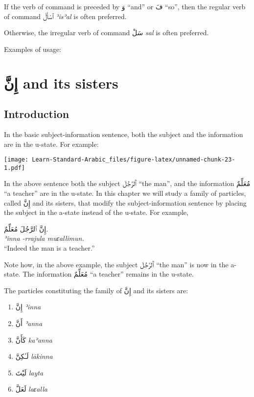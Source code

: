 \documentclass[
  10pt,
]{book}
\providecommand{\tightlist}{%
  \setlength{\itemsep}{0pt}\setlength{\parskip}{0pt}}
\begin{document}
If the verb of command is preceded by
\foreignlanguage{arabic}{وَ} \enquote{and}
or
\foreignlanguage{arabic}{فَ} \enquote{so}, then the regular verb of command
\foreignlanguage{arabic}{ٱسْأَلْ} \emph{ʾisʾal} is often preferred.

Otherwise, the irregular verb of command
\foreignlanguage{arabic}{سَلْ} \emph{sal} is often preferred.

Examples of usage:

\chapter{\texorpdfstring{\foreignlanguage{arabic}{إِنَّ} and its sisters}{إِنَّ and its sisters}}\label{ux625ux646-and-its-sisters}

\section{Introduction}\label{introduction-19}

In the basic subject-information sentence, both the subject and the information are in the u-state. For example:

\texttt{[image: Learn-Standard-Arabic\_files/figure-latex/unnamed-chunk-23-1.pdf]}

In the above sentence both the subject \foreignlanguage{arabic}{ٱَلرَّجُلَ} \enquote{the man}, and the information \foreignlanguage{arabic}{مُعَلِّمٌ} \enquote{a teacher} are in the u-state. In this chapter we will study a family of particles, called
\foreignlanguage{arabic}{إِنَّ} and its sisters,
that modify the subject-information sentence by placing the subject in the a-state instead of the u-state. For example,

\foreignlanguage{arabic}{إِنَّ ٱلرَّجُلَ مُعَلِّمٌ.}\\
\emph{ʾinna -rrajula muɛallimun.}\\
\enquote{Indeed the man is a teacher.}

Note how, in the above example, the subject \foreignlanguage{arabic}{ٱَلرَّجُلَ} \enquote{the man} is now in the a-state. The information \foreignlanguage{arabic}{مُعَلِّمٌ} \enquote{a teacher} remains in the u-state.

The particles constituting the family of
\foreignlanguage{arabic}{إِنَّ} and its sisters
are:

\begin{enumerate}
\def\labelenumi{\arabic{enumi}.}
\tightlist
\item
  \foreignlanguage{arabic}{إِنَّ} \emph{ʾinna}
\item
  \foreignlanguage{arabic}{أَنَّ} \emph{ʾanna}
\item
  \foreignlanguage{arabic}{کَأَنَّ} \emph{kaʾanna}
\item
  \foreignlanguage{arabic}{لَـٰکِنَّ} \emph{lākinna}
\item
  \foreignlanguage{arabic}{لَيْتَ} \emph{layta}
\item
  \foreignlanguage{arabic}{لَعَلَّ} \emph{laɛalla}
\end{enumerate}
\end{document}
